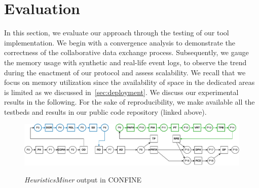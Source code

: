 \label{sec:discussion:subsec:convergence}
\section{Evaluation}
\label{sec:evaluation}

In this section, we evaluate our approach through the testing of our tool implementation. %
We begin with a convergence analysis %
to demonstrate the correctness of the collaborative data exchange process. Subsequently, we %
gauge the memory usage with synthetic and real-life event logs, to observe the trend during the enactment of our protocol and assess scalability. We recall that we focus on memory utilization since the availability of space in the dedicated areas is limited as we discussed in~\cref{sec:deployment}. We discuss our experimental results in the following.
For the sake of reproducibility, we make available all the testbeds and results in our public code repository (linked above).
%
\begin{figure}[t]
	\includegraphics[width=1\linewidth]{content/figures/mergedDep1.pdf}\label{fig:wfnet:d}
	\caption[HeuristicsMiner output]{\emph{HeuristicsMiner} output in CONFINE}
	\label{fig:wfnet}
\end{figure}    


